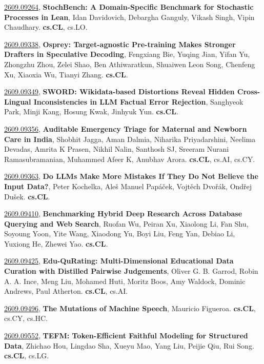 \documentclass[9pt, a4paper]{article}
\theoremstyle{plain}
\theoremstyle{definition}
\theoremstyle{remark}
\newcommand{\arxivwithtarget}[3]{\hypertarget{#1}{}\href{https://arxiv.org/abs/#1}{#1}, \textbf{\textcolor{arxivblue}{#2}}, #3. }
\begin{document}
\arxivwithtarget{2609.09264}{StochBench: A Domain-Specific Benchmark for Stochastic Processes in Lean}{Idan Davidovich, Debargha Ganguly, Vikash Singh, Vipin Chaudhary}\textbf{cs.CL}, cs.LO.



\arxivwithtarget{2609.09338}{Osprey: Target-agnostic Pre-training Makes Stronger Drafters in Speculative Decoding}{Fengxiang Bie, Yuqing Jian, Yifan Yu, Zhongzhu Zhou, Zelei Shao, Ben Athiwaratkun, Shuaiwen Leon Song, Chenfeng Xu, Xiaoxia Wu, Tianyi Zhang}\textbf{cs.CL}.



\arxivwithtarget{2609.09349}{SWORD: Wikidata-based Distortions Reveal Hidden Cross-Lingual Inconsistencies in LLM Factual Error Rejection}{Sanghyeok Park, Minji Kang, Hosung Kwak, Jinhyuk Yun}\textbf{cs.CL}.



\arxivwithtarget{2609.09356}{Auditable Emergency Triage for Maternal and Newborn Care in India}{Shobhit Jagga, Aman Dalmia, Niharika Priyadarshini, Neelima Devadas, Amrita K Prasen, Nikhil Nalin, Santhosh SJ, Sreeram Nurani Ramasubramanian, Muhammed Afeer K, Anubhav Arora}\textbf{cs.CL}, cs.AI, cs.CY.



\arxivwithtarget{2609.09363}{Do LLMs Make More Mistakes If They Do Not Believe the Input Data?}{Peter Kochelka, Aleš Manuel Papáček, Vojtěch Dvořák, Ondřej Dušek}\textbf{cs.CL}.



\arxivwithtarget{2609.09410}{Benchmarking Hybrid Deep Research Across Database Querying and Web Search}{Ruofan Wu, Peiran Xu, Xiaolong Li, Fan Shu, Soyoung Yoon, Yite Wang, Xiaodong Yu, Boyi Liu, Feng Yan, Debiao Li, Yuxiong He, Zhewei Yao}\textbf{cs.CL}.



\arxivwithtarget{2609.09425}{Edu-QuRating: Multi-Dimensional Educational Data Curation with Distilled Pairwise Judgements}{Oliver G. B. Garrod, Robin A. A. Ince, Meng Liu, Mohamed Huti, Moritz Boos, Amy Waldock, Dominic Andrews, Paul Atherton}\textbf{cs.CL}, cs.AI.



\arxivwithtarget{2609.09496}{The Mutations of Machine Speech}{Mauricio Figueroa}\textbf{cs.CL}, cs.CY, cs.HC.



\arxivwithtarget{2609.09552}{TEFM: Token-Efficient Faithful Modeling for Structured Data}{Zhichao Hou, Lingdao Sha, Xueyu Mao, Yang Liu, Peijie Qiu, Rui Song}\textbf{cs.CL}, cs.LG.
\end{document}
